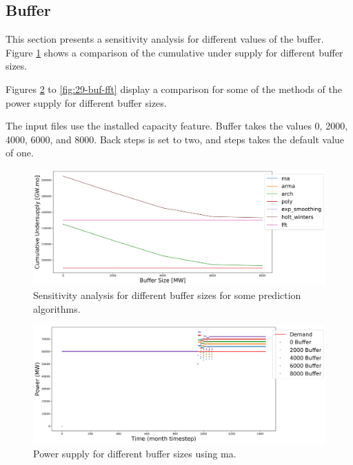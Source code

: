 \documentclass[11pt]{article}
\begin{document}
\subsection{Buffer}

This section presents a sensitivity analysis for different values of the buffer. Figure \ref{fig:29-buff} shows a comparison of the cumulative under supply for different buffer sizes.

Figures \ref{fig:29-buf-ma} to \ref{fig:29-buf-fft} display a comparison for some of the methods of the power supply for different buffer sizes.

The input files use the installed capacity feature. Buffer takes the values 0, 2000, 4000, 6000, and 8000. Back steps is set to two, and steps takes the default value of one.

\begin{figure}[H]
	\centering
	\includegraphics[width=\textwidth]{29-figures/29-sens-buffer.png} 
	\hfill
	\caption{Sensitivity analysis for different buffer sizes for some prediction algorithms.}
	\label{fig:29-buff}
\end{figure}

\begin{figure}[H]
	\centering
	\includegraphics[width=\textwidth]{29-figures/29-power-buffer-ma.png} 
	\hfill
	\caption{Power supply for different buffer sizes using ma.}
	\label{fig:29-buf-ma}
\end{figure}
\end{document}
